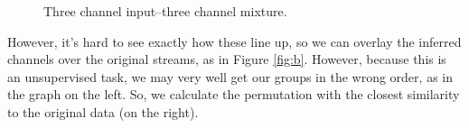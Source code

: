 \documentclass[11pt]{report}
\begin{document}
\begin{figure}[H]
  \centering
  \hfil
  \hfil
  \caption{Three channel input--three channel mixture.}
  \label{fig:a}
\end{figure}
However, it's hard to see exactly how these line up, so we can overlay the inferred channels over the original streams, as in Figure \ref{fig:b}. However, because this is an unsupervised task, we may very well get our groups in the wrong order, as in the graph on the left. So, we calculate the permutation with the closest similarity to the original data (on the right).
\end{document}
